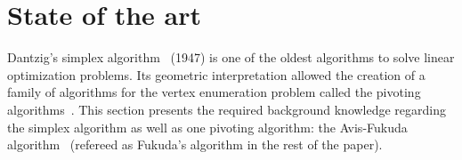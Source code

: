 \section{State of the art}
\label{section_sota}
Dantzig's simplex algorithm~\cite{simplex} (1947) is one of the oldest algorithms to solve linear optimization problems. Its geometric interpretation allowed the creation of a family of algorithms for the vertex enumeration problem called the pivoting algorithms~\cite{pivoting}. This section presents the required background knowledge regarding the simplex algorithm as well as one pivoting algorithm: the Avis-Fukuda algorithm~\cite{fukuda} (refereed as Fukuda's algorithm in the rest of the paper).


